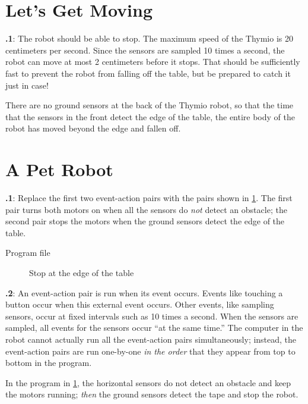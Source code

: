 \documentclass[11pt,a4paper,english]{article}
\begin{document}
\section{Let's Get Moving}

\textbf{\thesection.1}: The robot should be able to stop. The
maximum speed of the Thymio is 20 centimeters per second. Since the
sensors are sampled 10 times a second, the robot can move at most 2
centimeters before it stops. That should be sufficiently fast to prevent
the robot from falling off the table, but be prepared to catch it just
in case!

There are no ground sensors at the back of the Thymio robot, so that the
time that the sensors in the front detect the edge of the table, the
entire body of the robot has moved beyond the edge and fallen off.

\section{A Pet Robot}

\textbf{\thesection.1}: Replace the first two event-action pairs
with the pairs shown in \cref{fig.answer1}. The first pair turns
both motors on when all the sensors do \emph{not} detect an obstacle;
the second pair stops the motors when the ground sensors detect the edge
of the table.

{\raggedleft \hfill Program file }

\begin{figure}[hbt]
\begin{center}
\caption{Stop at the edge of the table}\label{fig.answer1}
\end{center}
\end{figure}

\textbf{\thesection.2}: An event-action pair is run when its event
occurs. Events like touching a button occur when this external event
occurs. Other events, like sampling sensors, occur at fixed intervals
such as 10 times a second. When the sensors are sampled, all events for
the sensors occur ``at the same time.'' The computer in the robot cannot
actually run all the event-action pairs simultaneously; instead, the
event-action pairs are run one-by-one \emph{in the order} that they
appear from top to bottom in the program.

In the program in \cref{fig.answer1}, the horizontal sensors
do not detect an obstacle and keep the motors running; \emph{then} the
ground sensors detect the tape and stop the robot.
\end{document}
